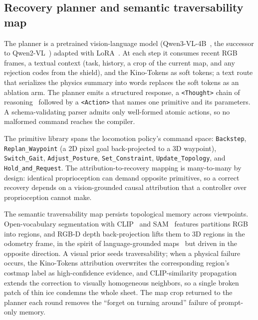 \documentclass[conference]{IEEEtran}
\newcommand{\kinotokens}{Kino-Tokens}
\begin{document}
\subsection{Recovery planner and semantic traversability map}
The planner is a pretrained vision-language model (Qwen3-VL-4B~\cite{bai2025qwen3vl},
the successor to Qwen2-VL~\cite{wang2024qwen2vl}) adapted with
LoRA~\cite{hu2022lora}. At each step it consumes recent RGB frames, a textual
context (task, history, a crop of the current map, and any rejection codes from the
shield), and the \kinotokens{} as soft tokens; a text route that serializes the
physics summary into words replaces the soft tokens as an ablation arm. The planner
emits a structured response, a \texttt{<Thought>} chain of
reasoning~\cite{wei2022chain} followed by a \texttt{<Action>} that names one
primitive and its parameters. A schema-validating parser admits only well-formed
atomic actions, so no malformed command reaches the compiler.

The primitive library spans the locomotion policy's command space:
\texttt{Backstep}, \texttt{Replan\_Waypoint} (a 2D pixel goal back-projected to a 3D
waypoint), \texttt{Switch\_Gait}, \texttt{Adjust\_Posture}, \texttt{Set\_Constraint},
\texttt{Update\_Topology}, and \texttt{Hold\_and\_Request}. The
attribution-to-recovery mapping is many-to-many by design: identical proprioception
can demand opposite primitives, so a correct recovery depends on a vision-grounded
causal attribution that a controller over proprioception cannot make.

The semantic traversability map persists topological memory across viewpoints.
Open-vocabulary segmentation with CLIP~\cite{radford2021clip} and
SAM~\cite{kirillov2023sam} features partitions RGB into regions, and RGB-D depth
back-projection lifts them to 3D regions in the odometry frame, in the spirit of
language-grounded maps~\cite{huang2023vlmaps,chen2023nlmap} but driven in the
opposite direction. A visual prior seeds traversability; when a physical failure
occurs, the \kinotokens{} attribution overwrites the corresponding region's
costmap label as high-confidence evidence, and CLIP-similarity propagation extends
the correction to visually homogeneous neighbors, so a single broken patch of thin
ice condemns the whole sheet. The map crop returned to the planner each round
removes the ``forget on turning around'' failure of prompt-only memory.
\end{document}

